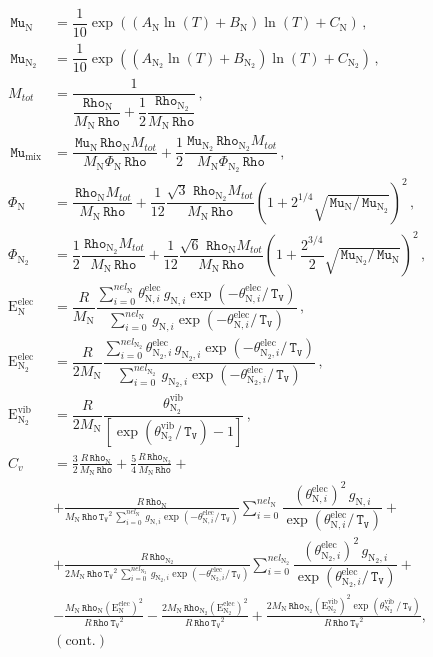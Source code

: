 \documentclass[10pt]{article}
\newcommand{\Rho}{\,\mathtt{Rho}}
\newcommand{\TV}{\,\mathtt{T_V}}
\newcommand{\N}{\text{N}}
\newcommand{\elec}{\text{elec}}
\newcommand{\vib}{\text{vib}}
\newcommand{\E}{\text{E}}
\newcommand{\Mu}{\, \mathtt{Mu}}
\newcommand{\eelecNden}{\,\sum_{i=0}^{nel_{\N}}   \, g_{\N,i}   \exp \left( -\theta^{\elec}_{\N,i} / \TV  \right) }
\newcommand{\eelecNdoisden}{\,\sum_{i=0}^{nel_{\N_2}}  \, g_{\N_2,i}   \exp \left( -\theta^{\elec}_{\N_2,i} /  \TV \right)}
\begin{document}
\begin{equation}
\begin{split}\label{eq:aux_02}	
%
\Mu_{\N} &= \dfrac{1}{10} \exp\left((A_{\N} \ln(T)+B_{\N}) \ln(T)+C_{\N}\right) \, ,\\
%
\Mu_{\N_2} &= \dfrac{1}{10} \exp\left((A_{\N_2} \ln(T)+B_{\N_2}) \ln(T)+C_{\N_2}\right) \, ,\\
%
M_{tot} &= \dfrac{1}{ \dfrac{\Rho_{\N}}{M_{\N}  \Rho }+ \dfrac{1}{2} \dfrac{ \Rho_{\N_2}}{M_{\N}  \Rho} }  \, ,\\ 
%
%
\Mu_{\text{mix}} &= \dfrac{\Mu_{\N} \Rho_{\N} M_{tot}}{M_{\N} \Phi_{\N} \Rho }+ \dfrac{1}{2} \dfrac{ \Mu_{\N_2} \Rho_{\N_2} M_{tot}}{M_{\N} \Phi_{\N_2} \Rho } \, ,\\
%
\Phi_{\N} & = \dfrac{ \Rho_{\N} M_{tot}}{M_{\N} \Rho }+\dfrac{1}{12}\dfrac{\sqrt{3} \, \Rho_{\N_2} M_{tot}}{M_{\N} \Rho } \left(1+2^{1/4} \sqrt{\Mu_{\N}/\Mu_{\N_2}} \right)^2 \, , \\
%
\Phi_{\N_2}  &= \dfrac{1}{2} \dfrac{\Rho_{\N_2} M_{tot}}{M_{\N} \Rho }+\dfrac{1}{12} \dfrac{\sqrt{6} \, \Rho_{\N} M_{tot}}{M_{\N} \Rho } \left(1+\dfrac{2^{3/4}}{2} \sqrt{\Mu_{\N_2}/\Mu_{\N}} \right)^2 \,, \\
%
\E_{\N}^{\elec} &= \dfrac{ R }{M_\N} \dfrac{\sum_{i=0}^{nel_{\N}} \theta^{\elec}_{\N,i}   \, g_{\N,i}   \exp \left( -\theta^{\elec}_{\N,i} / \TV  \right)}{\sum_{i=0}^{nel_{\N}}   \, g_{\N,i}   \exp \left( -\theta^{\elec}_{\N,i} / \TV  \right)} \,, \\ 
%
\E_{\N_2}^{\elec} &= \dfrac{ R }{ 2 M_\N} \dfrac{\sum_{i=0}^{nel_{\N_2}} \theta^{\elec}_{\N_2,i}   \, g_{\N_2,i}   \exp \left( -\theta^{\elec}_{\N_2,i} /  \TV \right) }{ \sum_{i=0}^{nel_{\N_2}}  \, g_{\N_2,i}   \exp \left( -\theta^{\elec}_{\N_2,i} /  \TV \right) } \,, \\
% 
\E_{\N_2}^{\vib}  &= \dfrac{ R}{2 M_\N }  \dfrac{  \theta^{\vib}_{\N_2} }{\left[ \exp \left( \theta^{\vib}_{\N_2} / \TV \right)-1 \right]} \,,\\ 
%
C_v &= \frac{3}{2} \frac{R \Rho_{\N}}{M_{\N} \Rho} + \frac{5}{4} \frac{R \Rho_{\N_2}}{M_{\N} \Rho} +\\
  &+ \frac{R \Rho_{\N} }{M_{\N} \Rho \TV^{2} \eelecNden } \sum_{i=0}^{nel_{\N}} \dfrac{ \left( \theta^{\elec}_{\N,i} \right)^2   \, g_{\N,i} }{ \exp \left( \theta^{\elec}_{\N,i} / \TV \right)} +\\
  &+ \frac{R \Rho_{\N_2} }{2 M_{\N} \Rho \TV^{2} \eelecNdoisden }  \sum_{i=0}^{nel_{\N_2}} \dfrac{ \left( \theta^{\elec}_{\N_2,i} \right)^2   \, g_{\N_2,i} }{ \exp \left( \theta^{\elec}_{\N_2,i} /  \TV \right)}+\\
  &- \frac{M_{\N} \Rho_{\N} \left( \E^{\elec}_{\N} \right)^2 }{R \Rho \TV^{2}} - \frac{2 M_{\N} \Rho_{\N_2} \left( \E^{\elec}_{\N_2} \right)^2 }{R \Rho \TV^{2}} + \frac{2 M_{\N} \Rho_{\N_2} \left( \E^{\vib}_{\N_2} \right)^2 \exp\left( \theta^{\vib}_{\N_2} \, / \TV \right) }{R \Rho \TV^{2}},\\
%
&(\text{cont.})
 \end{split}
\end{equation}
\end{document}
